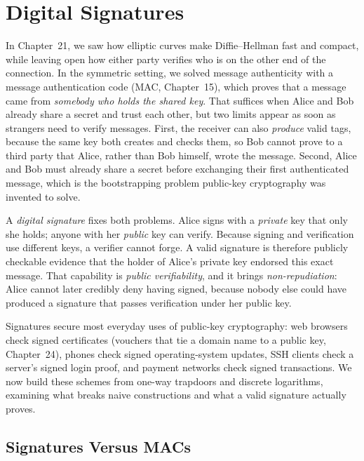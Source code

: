 \chapter{Digital Signatures}

In Chapter~21, we saw how elliptic curves make Diffie--Hellman fast and compact, while
leaving open how either party verifies who is on the other end of the connection. In the
symmetric setting, we solved message authenticity with a message authentication code (MAC, Chapter~15), which proves
that a message came from \emph{somebody who holds the shared key}. That suffices when Alice and Bob already share a secret and trust each other, but two limits appear as soon as strangers need to verify messages. First, the receiver can also \emph{produce} valid tags, because the same key both creates and checks them, so Bob cannot prove to a third party that Alice, rather than Bob himself, wrote the message. Second, Alice and Bob must already share a secret before exchanging their first authenticated message, which is the bootstrapping problem public-key cryptography was invented to solve.

A \emph{digital signature} fixes both problems. Alice signs with a \emph{private} key that only she holds; anyone with her \emph{public} key can verify. Because signing and verification use different keys, a verifier cannot forge. A valid signature is therefore publicly checkable evidence that the holder of Alice's private key endorsed this exact message. That capability is \emph{public verifiability}, and it brings \emph{non-repudiation}: Alice cannot later credibly deny having signed, because nobody else could have produced a signature that passes verification under her public key.

Signatures secure most everyday uses of public-key cryptography: web browsers check signed certificates (vouchers that tie a domain name to a public key, Chapter~24), phones check signed operating-system updates, SSH clients check a server's signed login proof, and payment networks check signed transactions. We now build these schemes from one-way trapdoors and discrete logarithms, examining what breaks naive constructions and what a valid signature actually proves.

\chapterline

\section{Signatures Versus MACs}
\label{ch22:sig-vs-mac}

